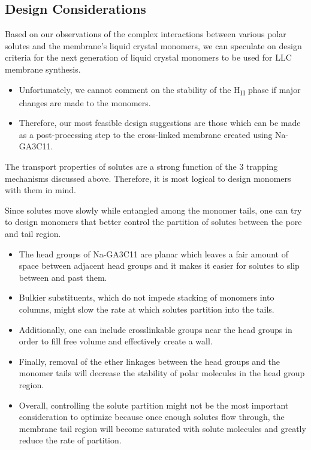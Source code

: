 \documentclass{article}
\begin{document}

  \subsection{Design Considerations}

  Based on our observations of the complex interactions between various polar solutes
  and the membrane's liquid crystal monomers, we can speculate on design criteria for 
  the next generation of liquid crystal monomers to be used for LLC membrane
  synthesis.
  \begin{itemize}
    \item Unfortunately, we cannot comment on the stability of the H\textsubscript{II}
    phase if major changes are made to the monomers.
    \item Therefore, our most feasible design suggestions are those which can be made
    as a post-processing step to the cross-linked membrane created using Na-GA3C11.
  \end{itemize}
  
  The transport properties of solutes are a strong function of the 3 trapping
  mechanisms discussed above. Therefore, it is most logical to design monomers with 
  them in mind. 
  
  Since solutes move slowly while entangled among the monomer tails, one can try to
  design monomers that better control the partition of solutes between the pore and
  tail region.
  \begin{itemize}
    \item The head groups of Na-GA3C11 are planar which leaves a fair amount of space
    between adjacent head groups and it makes it easier for solutes to slip between and
    past them.
    \item Bulkier substituents, which do not impede stacking of monomers into columns,
    might slow the rate at which solutes partition into the tails.
    \item Additionally, one can include crosslinkable groups near the head groups in
    order to fill free volume and effectively create a wall.
    \item Finally, removal of the ether linkages between the head groups and the monomer
    tails will decrease the stability of polar molecules in the head group region.
    \item Overall, controlling the solute partition might not be the most important 
    consideration to optimize because once enough solutes flow through, the membrane tail
    region will become saturated with solute molecules and greatly reduce the rate of partition.
  \end{itemize}
  
\end{document}
